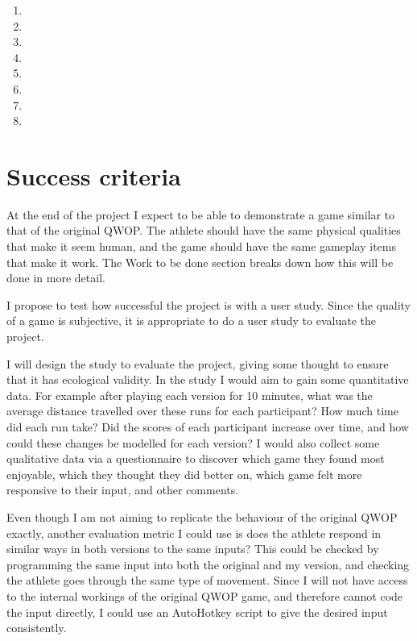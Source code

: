 \documentclass[12pt,a4paper,twoside]{article}
\begin{document}
\begin{enumerate}
\item \WorkA
\item \WorkB
\item \WorkC
\item \WorkD
\item \WorkE
\item \WorkF
\item \WorkG
\item \WorkH
\end{enumerate}


\section*{Success criteria}


At the end of the project I expect to be able to demonstrate a game similar to that of the original QWOP.
The athlete should have the same physical qualities that make it seem human, and the game should have the same gameplay items that make it work. The Work to be done section breaks down how this will be done in more detail.

I propose to test how successful the project is with a user study. Since the quality of a game is subjective, it is appropriate to do a user study to evaluate the project.

I will design the study to evaluate the project, giving some thought to ensure that it has ecological validity.
In the study I would aim to gain some quantitative data.
For example after playing each version for 10 minutes, what was the average distance travelled over these runs for each participant? How much time did each run take? Did the scores of each participant increase over time, and how could these changes be modelled for each version?
I would also collect some qualitative data via a questionnaire to discover which game they found most enjoyable, which they thought they did better on, which game felt more responsive to their input, and other comments.

Even though I am not aiming to replicate the behaviour of the original QWOP exactly, another evaluation metric I could use is does the athlete respond in similar ways in both versions to the same inputs? This could be checked by programming the same input into both the original and my version, and checking the athlete goes through the same type of movement. 
Since I will not have access to the internal workings of the original QWOP game, and therefore cannot code the input directly, I could use an AutoHotkey script to give the desired input consistently.
\end{document}
